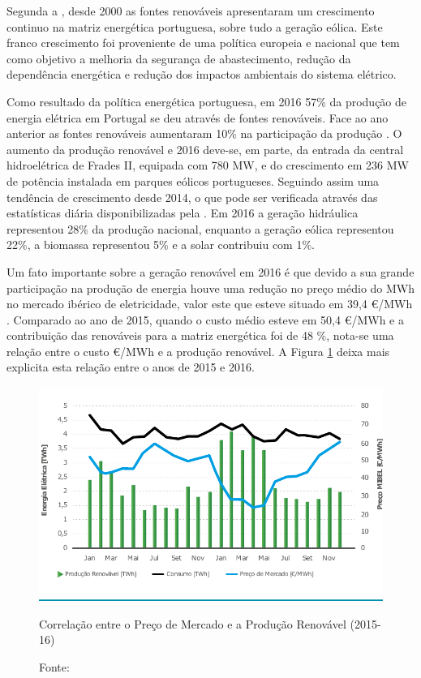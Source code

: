 Segunda a , desde 2000 as fontes renováveis apresentaram um crescimento continuo na matriz energética portuguesa, sobre tudo a geração eólica. Este franco crescimento foi proveniente de uma política europeia e nacional que tem como objetivo a melhoria da segurança de abastecimento, redução da dependência energética e redução dos impactos ambientais do sistema elétrico.  

Como resultado da política energética portuguesa, em 2016  57\% da produção de energia elétrica em Portugal se deu através de fontes renováveis. Face ao ano anterior as fontes renováveis aumentaram 10\% na participação da produção \cite[p.~8]{REN}. O aumento da produção renovável e 2016 deve-se, em parte, da entrada da central hidroelétrica de Frades II, equipada com 780 MW, e do crescimento em 236 MW de potência instalada em parques eólicos portugueses. Seguindo assim uma tendência de crescimento desde 2014, o que pode ser verificada através das estatísticas diária disponibilizadas pela .  Em 2016 a geração hidráulica representou 28\% da produção nacional, enquanto a geração eólica representou 22\%, a biomassa representou 5\% e a solar contribuiu com 1\%.

Um fato importante sobre a geração renovável em 2016 é que devido a sua grande participação na produção de energia houve uma redução no preço médio do MWh no mercado ibérico de eletricidade, valor este que esteve situado em 39,4 \euro/MWh \cite[p.~4]{apren}. Comparado ao ano de 2015, quando o custo médio esteve em 50,4 \euro/MWh e a contribuição das renováveis para a matriz energética foi de 48 \%, nota-se uma relação entre o custo \euro/MWh e a  produção renovável. A Figura \ref{fig:CorrelacaoPrecoMercadoProducaoRenovavel} deixa mais explicita esta relação entre o anos de 2015 e 2016.

\begin{figure}[H]
	\centering
	\captionsetup{width=0.85\textwidth, font=footnotesize, textfont=bf}
	\includegraphics[width=0.8\linewidth]{img/CorrelacaoPrecoMercadoProducaoRenovavel.pdf}
	\caption{Correlação entre o Preço de Mercado e a Produção Renovável (2015-16) }
	\vspace{-3.5mm}
	\caption*{Fonte: }
	\label{fig:CorrelacaoPrecoMercadoProducaoRenovavel}
\end{figure}

